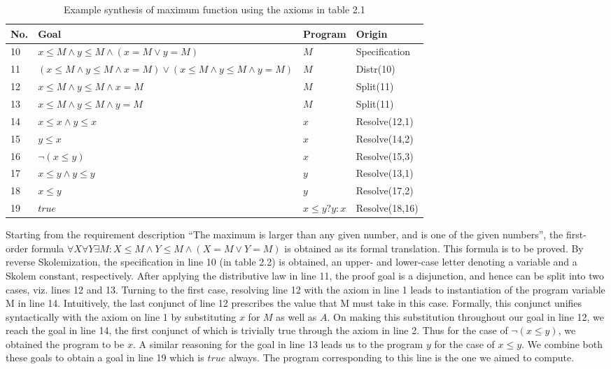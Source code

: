 \begin{table}[h!]
\centering
\label{max_synthesis}
\begin{adjustwidth}{-0.6cm}{}
\begin{tabular}{|l|l|l|l|}
\hline
No. & Goal & Program & Origin \\ \hline
10  & $x \leq M \wedge y \leq M \wedge (x = M \vee y = M)$ & $M$ & Specification\\
11  & $(x \leq M \wedge y \leq M \wedge x = M) \vee (x \leq M \wedge y \leq M \wedge y = M)$ &    $M$     		& Distr(10)  	\\
12  & $x \leq M \wedge y \leq M \wedge x = M$ & $M$ & Split(11) \\
13  & $x \leq M \wedge y \leq M \wedge y = M$ & $M$ & Split(11) \\
14  & $x \leq x \wedge y \leq x$ & $x$ & Resolve(12,1) \\
15  & $y \leq x$ & $x$ & Resolve(14,2) \\
16  & $\neg (x \leq y)$ & $x$ & Resolve(15,3) \\
17  & $x \leq y \wedge y \leq y$ & $y$ & Resolve(13,1) \\
18  & $x \leq y$ & $y$ & Resolve(17,2) \\
19  & $true$ & $x \leq y ? y : x$ & Resolve(18,16) \\ \hline
\end{tabular}
\end{adjustwidth}
\caption{Example synthesis of maximum function using the axioms in table 2.1}
\end{table}

\noindent
Starting from the requirement description ``The maximum is larger than any given number, and is one of the given numbers'', the first-order formula $\forall X \forall Y \exists M : X \leq M \wedge Y \leq M \wedge (X = M \vee Y = M)$ is obtained as its formal translation. This formula is to be proved. By reverse Skolemization, the specification in line 10 (in table 2.2) is obtained, an upper- and lower-case letter denoting a variable and a Skolem constant, respectively. After applying the distributive law in line 11, the proof goal is a disjunction, and hence can be split into two cases, viz. lines 12 and 13. Turning to the first case, resolving line 12 with the axiom in line 1 leads to instantiation of the program variable M in line 14. Intuitively, the last conjunct of line 12 prescribes the value that M must take in this case. Formally, this conjunct unifies syntactically with the axiom on line 1 by substituting $x$ for $M$ as well as $A$. On making this substitution throughout our goal in line 12, we reach the goal in line 14, the first conjunct of which is trivially true through the axiom in line 2. Thus for the case of $\neg (x \leq y)$, we obtained the program to be $x$. A similar reasoning for the goal in line 13 leads us to the program $y$ for the case of $x \leq y$. We combine both these goals to obtain a goal in line 19 which is $true$ always. The program corresponding to this line is the one we aimed to compute.

